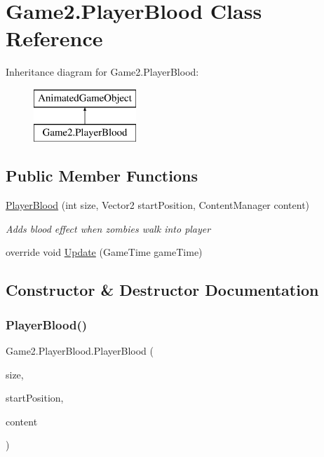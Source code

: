 \hypertarget{class_game2_1_1_player_blood}{}\section{Game2.\+Player\+Blood Class Reference}
\label{class_game2_1_1_player_blood}
Inheritance diagram for Game2.\+Player\+Blood\+:\begin{figure}[H]
\begin{center}
\leavevmode
\includegraphics[height=2.000000cm]{class_game2_1_1_player_blood}
\end{center}
\end{figure}
\subsection*{Public Member Functions}
\begin{DoxyCompactItemize}
\item 
\mbox{\hyperlink{class_game2_1_1_player_blood_a353c696afecffe2fd3dc22d2d15f14bb}{Player\+Blood}} (int size, Vector2 start\+Position, Content\+Manager content)
\begin{DoxyCompactList}\small\item\em Adds blood effect when zombies walk into player \end{DoxyCompactList}\item 
override void \mbox{\hyperlink{class_game2_1_1_player_blood_a165cc6d8cf92da781ba21ce9cabca5be}{Update}} (Game\+Time game\+Time)
\end{DoxyCompactItemize}


\subsection{Constructor \& Destructor Documentation}
\mbox{\label{class_game2_1_1_player_blood_a353c696afecffe2fd3dc22d2d15f14bb}} 
\subsubsection{\texorpdfstring{Player\+Blood()}{PlayerBlood()}}
{\footnotesize\ttfamily Game2.\+Player\+Blood.\+Player\+Blood (\begin{DoxyParamCaption}\item[{int}]{size,  }\item[{Vector2}]{start\+Position,  }\item[{Content\+Manager}]{content }\end{DoxyParamCaption})}



